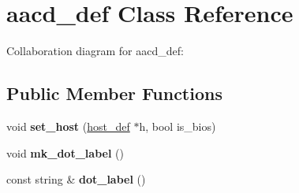 \hypertarget{classaacd__def}{}\section{aacd\+\_\+def Class Reference}
\label{classaacd__def}


Collaboration diagram for aacd\+\_\+def\+:
\subsection*{Public Member Functions}
\begin{DoxyCompactItemize}
\item 
\mbox{\label{classaacd__def_a1daa99eb53b3295d2ef3c82b43c1af39}} 
void {\bfseries set\+\_\+host} (\mbox{\hyperlink{classhost__def}{host\+\_\+def}} $\ast$h, bool is\+\_\+bios)
\item 
\mbox{\label{classaacd__def_a43d958f51b7c9ac1f0c55bd75d370c3f}} 
void {\bfseries mk\+\_\+dot\+\_\+label} ()
\item 
\mbox{\label{classaacd__def_a3b16eddcf4862c2fbd5cc43f67fe63cd}} 
const string \& {\bfseries dot\+\_\+label} ()
\end{DoxyCompactItemize}
